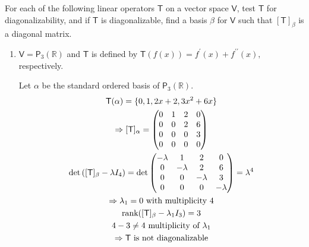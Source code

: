 For each of the following linear operators $\mathsf{T}$ on a vector
space $\mathsf{V}$, test $\mathsf{T}$ for diagonalizability, and if
$\mathsf{T}$ is diagonalizable, find a basis $\beta$ for $\mathsf{V}$
such that $[\mathsf{T}]_\beta$ is a diagonal matrix.
\begin{enumerate}
\item $\mathsf{V}=\mathsf{P}_3(\mathbb{R})$ and $\mathsf{T}$ is
  defined by $\mathsf{T}(f(x)) = f^\prime(x) + f^{\prime\prime}(x),$
  respectively.

Let $\alpha$ be the standard ordered basis of
$\mathsf{P}_3(\mathbb{R})$.
\begin{gather}
\mathsf{T}(\alpha) = \{0,1,2x+2,3x^2+6x\}\\
\Rightarrow [\mathsf{T}]_\alpha = \begin{pmatrix}
0 & 1 & 2 & 0\\
0 & 0 & 2 & 6\\
0 & 0 & 0 & 3\\
0 & 0 & 0 & 0
\end{pmatrix}\\
\det{([\mathsf{T}]_\beta -\lambda I_4)} = \det{\begin{pmatrix}
-\lambda & 1 & 2 & 0\\
0 & -\lambda & 2 & 6\\
0 & 0 & -\lambda & 3\\
0 & 0 & 0 & -\lambda
    \end{pmatrix}} = \lambda^4\\
\Rightarrow \lambda_1 = 0 \text{ with multiplicity 4}\\
\text{rank}({[\mathsf{T}]_\beta - \lambda_1I_3}) = 3\\
4-3\neq 4 \text{ multiplicity of } \lambda_1 \\
\notag \Rightarrow \mathsf{T} \text{ is not diagonalizable}
\end{gather}
\end{enumerate}
